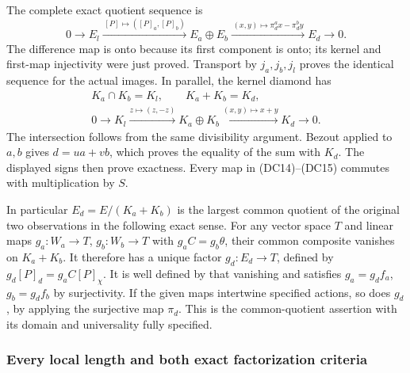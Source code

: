 The complete exact quotient sequence is
\[
 0\longrightarrow E_l
 \xrightarrow{\, [P]\mapsto([P]_a,[P]_b)\,}
 E_a\oplus E_b
 \xrightarrow{\, (x,y)\mapsto\pi_d^a x-\pi_d^b y\,}
 E_d\longrightarrow0 .
 \tag{DC14}
\]
The difference map is onto because its first component is onto;
its kernel and first-map injectivity were just proved.  Transport by
$j_a,j_b,j_l$ proves the identical sequence for the actual images.
In parallel, the kernel diamond has
\[
 \begin{gathered}
 K_a\cap K_b=K_l,\qquad K_a+K_b=K_d,\\
 0\longrightarrow K_l
 \xrightarrow{z\mapsto(z,-z)}K_a\oplus K_b
 \xrightarrow{(x,y)\mapsto x+y}K_d\longrightarrow0 .
 \end{gathered}
 \tag{DC15}
\]
The intersection follows from the same divisibility argument.
Bezout applied to $a,b$ gives $d=ua+vb$, which proves the equality
of the sum with $K_d$.  The displayed signs then prove exactness.
Every map in (DC14)--(DC15) commutes with multiplication by $S$.

In particular $E_d=E/(K_a+K_b)$ is the largest common quotient of
the original two observations in the following exact sense.
For any vector space $T$ and linear maps $g_a:W_a\to T$,
$g_b:W_b\to T$ with $g_aC=g_b\theta$, their common composite
vanishes on $K_a+K_b$.  It therefore has a unique factor
$g_d:E_d\to T$, defined by $g_d[P]_d=g_aC[P]_\chi$.
It is well defined by that vanishing and satisfies
$g_a=g_df_a$, $g_b=g_df_b$ by surjectivity.  If the given maps
intertwine specified actions, so does $g_d$, by applying the
surjective map $\pi_d$.  This is the common-quotient assertion
with its domain and universality fully specified.

\subsubsection{Every local length and both exact factorization criteria}

